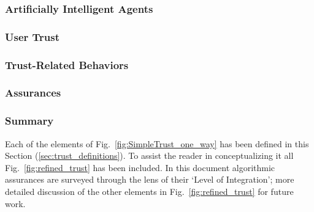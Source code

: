 \subsubsection*{Artificially Intelligent Agents} %

\subsubsection*{User Trust} %

\subsubsection*{Trust-Related Behaviors} %

\subsubsection*{Assurances} \label{sec:assurances}


\subsubsection*{Summary}
Each of the elements of Fig.~\ref{fig:SimpleTrust_one_way} has been defined in this Section (\ref{sec:trust_definitions}). To assist the reader in conceptualizing  it all Fig.~\ref{fig:refined_trust} has been included. In this document algorithmic assurances are surveyed through the lens of their `Level of Integration'; more detailed discussion of the other elements in Fig.~\ref{fig:refined_trust} for future work.
